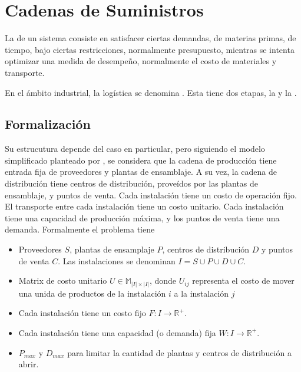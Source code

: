 \chapter{Cadenas de Suministros}
\label{cap:supply}

La  de un sistema consiste en satisfacer ciertas demandas,
de materias primas, de tiempo, bajo ciertas restricciones, normalmente
presupuesto, mientras se intenta optimizar una medida de desempeño, normalmente
el costo de materiales y transporte.

En el ámbito industrial, la logística se denomina .
Esta tiene dos etapas, la  y la  \cite{Musmanno2004}.

\section{Formalización}

Su estrucutura depende del caso en particular, pero siguiendo el modelo
simplificado planteado por \cite{Canales2016}, se considera que la cadena de
producción tiene entrada fija de proveedores y plantas de ensamblaje. A su vez,
la cadena de distribución tiene centros de distribución, proveídos por las
plantas de ensamblaje, y puntos de venta. Cada instalación tiene un costo de
operación fijo. El transporte entre cada instalación tiene un costo unitario.
Cada instalación tiene una capacidad de producción máxima, y los puntos de venta
tiene una demanda. Formalmente el problema tiene

\begin{itemize}
  \item Proveedores $S$, plantas de ensamplaje $P$, centros de distribución $D$
        y puntos de venta $C$. Las instalaciones se denominan
        $I = S \cup P \cup D \cup C$.
  \item Matrix de costo unitario $U \in \mathbb{M}_{|I| \times |I|}$, donde
        $U_{ij}$ representa el costo de mover una unida de productos de la
        instalación $i$ a la instalación $j$
  \item Cada instalación tiene un costo fijo $F: I \to \mathbb{R}^{+}$.
  \item Cada instalación tiene una capacidad (o demanda) fija
        $W: I \to \mathbb{R}^{+}$.
  \item $P_{max}$ y $D_{max}$ para limitar la cantidad de plantas y centros de
        distribución a abrir.
\end{itemize}

